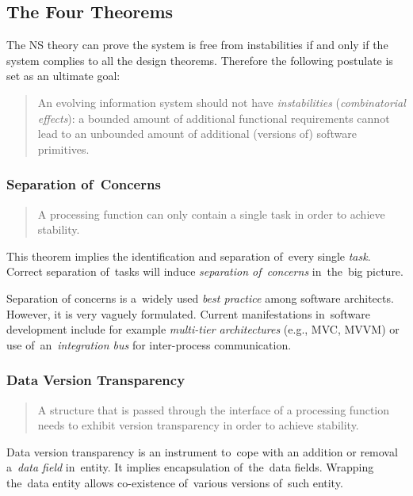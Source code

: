 \documentclass[thesis=M,english,hidelinks]{FITthesis}[2012/10/20]
\begin{document}
\subsection{The Four Theorems}
The \acrshort{NS} theory can prove the system is free from instabilities if and only if the system complies to all the design theorems. Therefore the following postulate is set as an ultimate goal:
\begin{quote}
    An evolving information system should not have \textit{instabilities} (\textit{combinatorial effects}): a bounded amount of additional functional requirements cannot lead to an unbounded amount of additional (versions of) software primitives.~\cite{ns-toward-general-theory}
\end{quote}

\subsubsection{Separation of~Concerns}
\begin{quote}
A processing function can only contain a single task in order to achieve stability.~\cite{ns-toward-general-theory}
\end{quote}

This theorem implies the identification and separation of~every single \textit{task}. Correct separation of~tasks will induce \emph{separation of~concerns} in~the~big picture.

Separation of concerns is a~widely used \emph{best practice} among software architects. However, it is very vaguely formulated. Current manifestations in~software development include for example \emph{multi-tier architectures} (e.g., \acrshort{MVC}, \acrshort{MVVM}) or use of~an~\emph{integration bus} for inter-process communication.

\subsubsection{Data Version Transparency}
\begin{quote}
A structure that is passed through the interface of a processing function needs to exhibit version transparency in order to achieve stability.~\cite{ns-toward-general-theory}
\end{quote}

Data version transparency is an instrument to~cope with an addition or removal a~\emph{data field} in~entity. It implies encapsulation of~the~data fields. Wrapping the~data entity allows co-existence of~various versions of~such entity.
\end{document}
